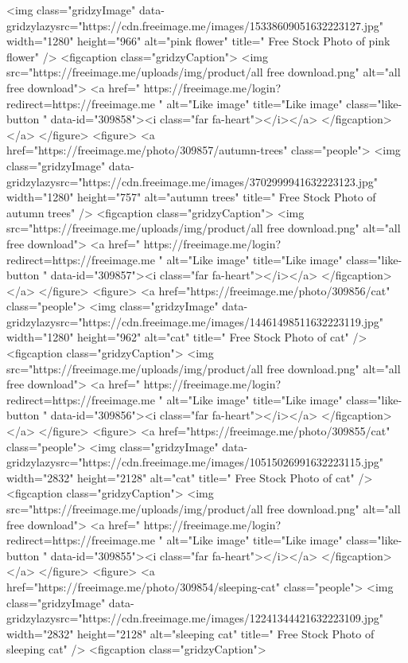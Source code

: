<img class="gridzyImage" data-gridzylazysrc="https://cdn.freeimage.me/images/15338609051632223127.jpg" width="1280" height="966" alt="pink flower" title=" Free Stock Photo of pink flower" />
<figcaption class="gridzyCaption">
<img src="https://freeimage.me/uploads/img/product/all free download.png" alt="all free download">
<a href=" https://freeimage.me/login?redirect=https://freeimage.me " alt="Like image" title="Like image" class="like-button  " data-id="309858"><i class="far fa-heart"></i></a>
</figcaption>
</a>
</figure>
<figure>
<a href="https://freeimage.me/photo/309857/autumn-trees" class="people">
<img class="gridzyImage" data-gridzylazysrc="https://cdn.freeimage.me/images/3702999941632223123.jpg" width="1280" height="757" alt="autumn trees" title=" Free Stock Photo of autumn trees" />
<figcaption class="gridzyCaption">
<img src="https://freeimage.me/uploads/img/product/all free download.png" alt="all free download">
<a href=" https://freeimage.me/login?redirect=https://freeimage.me " alt="Like image" title="Like image" class="like-button  " data-id="309857"><i class="far fa-heart"></i></a>
</figcaption>
</a>
</figure>
<figure>
<a href="https://freeimage.me/photo/309856/cat" class="people">
<img class="gridzyImage" data-gridzylazysrc="https://cdn.freeimage.me/images/14461498511632223119.jpg" width="1280" height="962" alt="cat" title=" Free Stock Photo of cat" />
<figcaption class="gridzyCaption">
<img src="https://freeimage.me/uploads/img/product/all free download.png" alt="all free download">
<a href=" https://freeimage.me/login?redirect=https://freeimage.me " alt="Like image" title="Like image" class="like-button  " data-id="309856"><i class="far fa-heart"></i></a>
</figcaption>
</a>
</figure>
<figure>
<a href="https://freeimage.me/photo/309855/cat" class="people">
<img class="gridzyImage" data-gridzylazysrc="https://cdn.freeimage.me/images/10515026991632223115.jpg" width="2832" height="2128" alt="cat" title=" Free Stock Photo of cat" />
<figcaption class="gridzyCaption">
<img src="https://freeimage.me/uploads/img/product/all free download.png" alt="all free download">
<a href=" https://freeimage.me/login?redirect=https://freeimage.me " alt="Like image" title="Like image" class="like-button  " data-id="309855"><i class="far fa-heart"></i></a>
</figcaption>
</a>
</figure>
<figure>
 <a href="https://freeimage.me/photo/309854/sleeping-cat" class="people">
<img class="gridzyImage" data-gridzylazysrc="https://cdn.freeimage.me/images/12241344421632223109.jpg" width="2832" height="2128" alt="sleeping cat" title=" Free Stock Photo of sleeping cat" />
<figcaption class="gridzyCaption">

